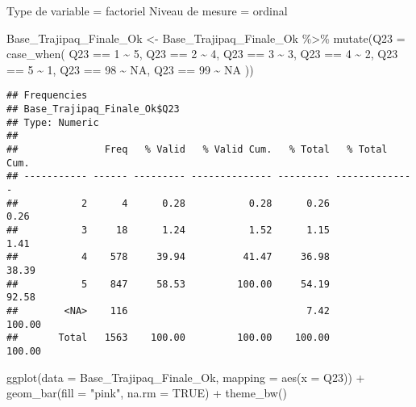 \documentclass[
]{article}
\newenvironment{Shaded}{\begin{snugshade}}{\end{snugshade}}
\newcommand{\AttributeTok}[1]{\textcolor[rgb]{0.77,0.63,0.00}{#1}}
\newcommand{\ConstantTok}[1]{\textcolor[rgb]{0.00,0.00,0.00}{#1}}
\newcommand{\DecValTok}[1]{\textcolor[rgb]{0.00,0.00,0.81}{#1}}
\newcommand{\FunctionTok}[1]{\textcolor[rgb]{0.00,0.00,0.00}{#1}}
\newcommand{\NormalTok}[1]{#1}
\newcommand{\OtherTok}[1]{\textcolor[rgb]{0.56,0.35,0.01}{#1}}
\newcommand{\SpecialCharTok}[1]{\textcolor[rgb]{0.00,0.00,0.00}{#1}}
\newcommand{\StringTok}[1]{\textcolor[rgb]{0.31,0.60,0.02}{#1}}
\begin{document}
Type de variable = factoriel Niveau de mesure = ordinal

\begin{Shaded}
\begin{Highlighting}[]
\NormalTok{Base\_Trajipaq\_Finale\_Ok }\OtherTok{\textless{}{-}}
\NormalTok{  Base\_Trajipaq\_Finale\_Ok }\SpecialCharTok{\%\textgreater{}\%}
  \FunctionTok{mutate}\NormalTok{(}\AttributeTok{Q23 =} \FunctionTok{case\_when}\NormalTok{(}
\NormalTok{    Q23 }\SpecialCharTok{==} \DecValTok{1} \SpecialCharTok{\textasciitilde{}} \DecValTok{5}\NormalTok{,}
\NormalTok{    Q23 }\SpecialCharTok{==} \DecValTok{2} \SpecialCharTok{\textasciitilde{}} \DecValTok{4}\NormalTok{,}
\NormalTok{    Q23 }\SpecialCharTok{==} \DecValTok{3} \SpecialCharTok{\textasciitilde{}} \DecValTok{3}\NormalTok{,}
\NormalTok{    Q23 }\SpecialCharTok{==} \DecValTok{4} \SpecialCharTok{\textasciitilde{}} \DecValTok{2}\NormalTok{,}
\NormalTok{    Q23 }\SpecialCharTok{==} \DecValTok{5} \SpecialCharTok{\textasciitilde{}} \DecValTok{1}\NormalTok{,}
\NormalTok{    Q23 }\SpecialCharTok{==} \DecValTok{98} \SpecialCharTok{\textasciitilde{}} \ConstantTok{NA}\NormalTok{,}
\NormalTok{    Q23 }\SpecialCharTok{==} \DecValTok{99} \SpecialCharTok{\textasciitilde{}} \ConstantTok{NA}
\NormalTok{  ))}
\end{Highlighting}
\end{Shaded}

\begin{Shaded}
\end{Shaded}

\begin{verbatim}
## Frequencies  
## Base_Trajipaq_Finale_Ok$Q23  
## Type: Numeric  
## 
##               Freq   % Valid   % Valid Cum.   % Total   % Total Cum.
## ----------- ------ --------- -------------- --------- --------------
##           2      4      0.28           0.28      0.26           0.26
##           3     18      1.24           1.52      1.15           1.41
##           4    578     39.94          41.47     36.98          38.39
##           5    847     58.53         100.00     54.19          92.58
##        <NA>    116                               7.42         100.00
##       Total   1563    100.00         100.00    100.00         100.00
\end{verbatim}

\begin{Shaded}
\begin{Highlighting}[]
\FunctionTok{ggplot}\NormalTok{(}\AttributeTok{data =}\NormalTok{ Base\_Trajipaq\_Finale\_Ok, }\AttributeTok{mapping =} \FunctionTok{aes}\NormalTok{(}\AttributeTok{x =}\NormalTok{ Q23)) }\SpecialCharTok{+}
  \FunctionTok{geom\_bar}\NormalTok{(}\AttributeTok{fill =} \StringTok{"pink"}\NormalTok{, }\AttributeTok{na.rm =} \ConstantTok{TRUE}\NormalTok{) }\SpecialCharTok{+}
  \FunctionTok{theme\_bw}\NormalTok{()}
\end{Highlighting}
\end{Shaded}
\end{document}
